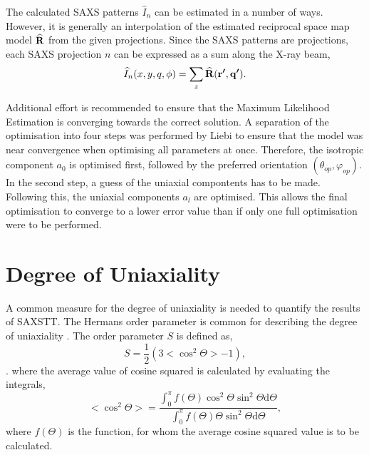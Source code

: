 The calculated SAXS patterns $\widehat{I}_{n}$ can be estimated in a number of ways.
However, it is generally an interpolation of the estimated reciprocal space map model $\bm{\mathrm{\widehat{R}}}$ from the given projections.
Since the SAXS patterns are projections, each SAXS projection $n$ can be expressed as a sum along the X-ray beam,
\begin{equation}\label{eq:SAXS_intensity}
    \widehat{I}_{n}(x,y,q,\phi) = \sum_{z} \bm{\widehat{\mathrm{R}}}(\bm{\mathrm{r'}}, \bm{\mathrm{q'}}).
\end{equation}

Additional effort is recommended to ensure that the Maximum Likelihood Estimation is converging towards the correct solution.
A separation of the optimisation into four steps was performed by Liebi \cite{liebi2018small} to ensure that the model was near convergence when optimising all parameters at once.
Therefore, the isotropic component $a_{0}$ is optimised first, followed by the preferred orientation $(\theta_{op}, \varphi_{op})$. In the second step, a guess of the uniaxial compontents has to be made.
Following this, the uniaxial components $a_{l}$ are optimised.
This allows the final optimisation to converge to a lower error value than if only one full optimisation were to be performed.


\section{Degree of Uniaxiality} %

A common measure for the degree of uniaxiality is needed to quantify the results of SAXSTT.
The Hermans order parameter is common for describing the degree of uniaxiality \cite{yoshiharu1997cellulose}.
The order parameter $S$ is defined as,
\begin{equation}
    S = \frac{1}{2} \left( 3 <\cos^{2} \Theta> - 1 \right),
\end{equation}.
\noindent
where the average value of cosine squared is calculated by evaluating the integrals,
\begin{equation}
    <\cos^{2} \Theta> = \frac{ \int_{0}^{\pi} f (\Theta) \cos^{2} \Theta \sin^{2} \Theta  \mathrm{d}\Theta  }
    {\int_{0}^{\pi} f (\Theta) \Theta \sin^{2} \Theta  \mathrm{d}\Theta },
\end{equation}
\noindent
where $f(\Theta)$ is the function, for whom the average cosine squared value is to be calculated.